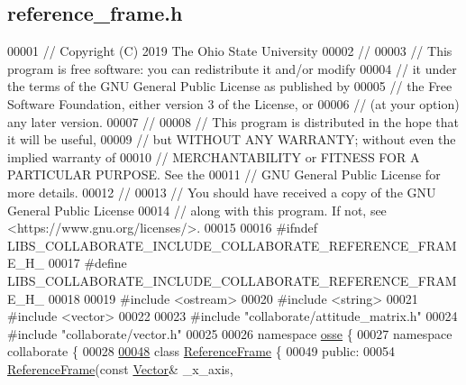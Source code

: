 \hypertarget{reference__frame_8h_source}{}\subsection{reference\+\_\+frame.\+h}
\label{reference__frame_8h_source}

\begin{DoxyCode}
00001 \textcolor{comment}{// Copyright (C) 2019 The Ohio State University}
00002 \textcolor{comment}{//}
00003 \textcolor{comment}{// This program is free software: you can redistribute it and/or modify}
00004 \textcolor{comment}{// it under the terms of the GNU General Public License as published by}
00005 \textcolor{comment}{// the Free Software Foundation, either version 3 of the License, or}
00006 \textcolor{comment}{// (at your option) any later version.}
00007 \textcolor{comment}{//}
00008 \textcolor{comment}{// This program is distributed in the hope that it will be useful,}
00009 \textcolor{comment}{// but WITHOUT ANY WARRANTY; without even the implied warranty of}
00010 \textcolor{comment}{// MERCHANTABILITY or FITNESS FOR A PARTICULAR PURPOSE.  See the}
00011 \textcolor{comment}{// GNU General Public License for more details.}
00012 \textcolor{comment}{//}
00013 \textcolor{comment}{// You should have received a copy of the GNU General Public License}
00014 \textcolor{comment}{// along with this program.  If not, see <https://www.gnu.org/licenses/>.}
00015 
00016 \textcolor{preprocessor}{#ifndef LIBS\_COLLABORATE\_INCLUDE\_COLLABORATE\_REFERENCE\_FRAME\_H\_}
00017 \textcolor{preprocessor}{#define LIBS\_COLLABORATE\_INCLUDE\_COLLABORATE\_REFERENCE\_FRAME\_H\_}
00018 
00019 \textcolor{preprocessor}{#include <ostream>}
00020 \textcolor{preprocessor}{#include <string>}
00021 \textcolor{preprocessor}{#include <vector>}
00022 
00023 \textcolor{preprocessor}{#include "collaborate/attitude\_matrix.h"}
00024 \textcolor{preprocessor}{#include "collaborate/vector.h"}
00025 
00026 \textcolor{keyword}{namespace }\hyperlink{namespaceosse}{osse} \{
00027 \textcolor{keyword}{namespace }collaborate \{
00028 
\hyperlink{classosse_1_1collaborate_1_1_reference_frame}{00048} \textcolor{keyword}{class }\hyperlink{classosse_1_1collaborate_1_1_reference_frame}{ReferenceFrame} \{
00049  \textcolor{keyword}{public}:
00054   \hyperlink{classosse_1_1collaborate_1_1_reference_frame_aa7a87b7392e85b87cf0994457f0b5b6a}{ReferenceFrame}(\textcolor{keyword}{const} \hyperlink{classosse_1_1collaborate_1_1_vector}{Vector}& \_x\_axis,

\end{DoxyCode}
